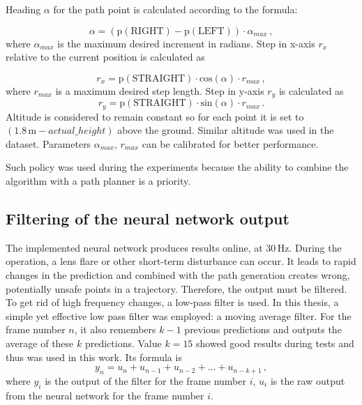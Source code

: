 Heading $\alpha$ for the path point is calculated according to the formula:

\begin{equation}
	\alpha = (\textrm{p}(\textrm{RIGHT}) - \textrm{p}(\textrm{LEFT}))\cdot \alpha_{max}\,,
\end{equation}
where $\alpha_{max}$ is the maximum desired increment in radians. Step in x-axis $r_x$ relative to the current position is calculated as

\begin{equation}
	r_x = \textrm{p}(\textrm{STRAIGHT})\cdot \textrm{cos}(\alpha)\cdot r_{max}\,,
\end{equation}
where $r_{max}$ is a maximum desired step length. Step in y-axis $r_y$ is calculated as
\begin{equation}
	r_y = \textrm{p}(\textrm{STRAIGHT})\cdot \textrm{sin}(\alpha)\cdot r_{max}\,.
\end{equation}
Altitude is considered to remain constant so for each point it is set to $(1.8\,\textrm{m} - actual\_height)$ above the ground. Similar altitude was used in the dataset. Parameters $\alpha_{max}$, $r_{max}$ can be calibrated for better performance.

Such policy was used during the experiments because the ability to combine the algorithm with a path planner is a priority.

\subsection{Filtering of the neural network output}

The implemented neural network produces results online, at 30\,Hz. During the operation, a lens flare or other short-term disturbance can occur. It leads to rapid changes in the prediction and combined with the path generation creates wrong, potentially unsafe points in a trajectory. Therefore, the output must be filtered. To get rid of high frequency changes, a low-pass filter is used. In this thesis, a simple yet effective low pass filter was employed: a moving average filter. For the frame number $n$, it also remembers $k-1$ previous predictions and outputs the average of these $k$ predictions. Value $k=15$ showed good results during tests and thus was used in this work. Its formula is
\begin{equation}
	y_n = u_n + u_{n-1} + u_{n-2} + ... + u_{n-k+1}\,,
\end{equation}
where $y_i$ is the output of the filter for the frame number $i$, $u_i$ is the raw output from the neural network for the frame number $i$.


